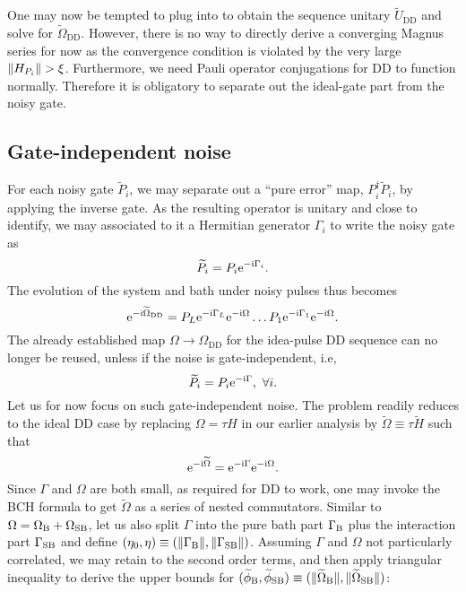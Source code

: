 \documentclass[b5paper,11pt]{article}
\newcommand{\wtP}{\widetilde{P}}
\newcommand{\wtH}{\widetilde{H}}
\newcommand{\wtO}{\widetilde{\Omega}}
\newcommand{\wtU}{\widetilde{U}}
\newcommand{\rDD}{\mathrm{DD}}
\begin{document}
One may now be tempted to plug  into  to obtain the sequence unitary $\wtU_\rDD$ and solve for $\wtO_\rDD$. However, there is no way to directly derive a converging Magnus series for now as the convergence condition is violated by the very large $\Vert {H_{P_i}} \Vert >\xi$. Furthermore, we need Pauli operator conjugations for DD to function normally.  Therefore it is obligatory to separate out the ideal-gate part from the noisy gate.

\subsection{Gate-independent noise}
For each noisy gate $\wtP_i$, we may separate out a ``pure error'' map, $P_i^{\dagger} \wtP_i$, by applying the inverse gate.  As the resulting operator is unitary and close to identify,  we may associated to it a Hermitian generator $\Gamma_i$ to write the noisy gate as
\begin{equation}
 \wtP_i = P_i \upe^{-\upi \Gamma_i}.
\end{equation}
The evolution of the system and bath under noisy pulses thus becomes
\begin{equation}\label{eq:UDD-gatedep}
 \upe^{-\upi\wtO_\rDD} = P_L\upe^{-\upi \Gamma_L} \upe^{-\upi \Omega} \ldots  P_1\upe^{-\upi \Gamma_1}\upe^{-\upi \Omega }.
\end{equation}
The already established map $\Omega\to \Omega_{\rDD}$ for the idea-pulse DD sequence can no longer be reused, unless if the noise is gate-independent, i.e,
\begin{equation}\label{eq:gateindep1}
 \wtP_i = P_i \upe^{-\upi \Gamma},\ \forall i.
\end{equation}
Let us for now focus on such gate-independent noise. The problem readily reduces to the ideal DD case by replacing $\Omega=\tau H$ in our earlier analysis by $\wtO \equiv \tau \wtH$ such that
\begin{equation}
\upe^{-\upi \wtO}=\upe^{-\upi \Gamma}\upe^{-\upi \Omega}.
\end{equation}
Since $\Gamma$ and $\Omega$ are both small, as required for DD to work,
one may invoke the BCH formula to get $\wtO$ as a series of nested commutators. 
Similar to $\Omega=\Omega_{\mathrm{B}} + \Omega_{\mathrm{SB}}$, let us also split $\Gamma$ into the pure bath part $\Gamma_{\mathrm{B}}$ plus the interaction part $\Gamma_{\mathrm{SB}}$ and define 
$(\eta_0,\eta) \equiv (\Vert\Gamma_{\mathrm{B}}\Vert, \Vert\Gamma_{\mathrm{SB}}\Vert)$.
Assuming $\Gamma$ and $\Omega$ not particularly correlated, we may retain to the second order terms, and then apply triangular inequality to derive the upper bounds for $(\widetilde\phi_\rB,\widetilde{\phi}_\rSB) \equiv( \norm{\wtO_\rB}, \norm{\wtO_\rSB})$:
\end{document}
